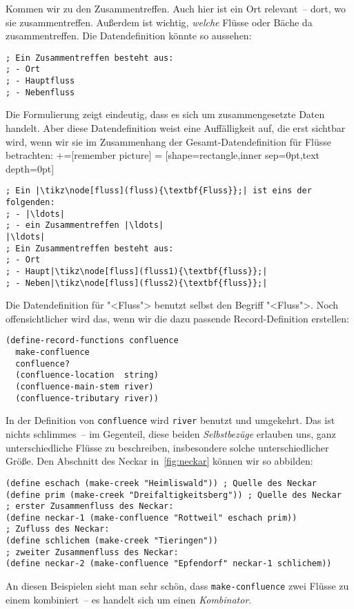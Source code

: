 Kommen wir zu den Zusammentreffen.  Auch hier ist ein Ort relevant~--
dort, wo sie zusammentreffen.  Außerdem ist wichtig, \emph{welche}
Flüsse oder Bäche da zusammentreffen.  Die Datendefinition könnte so
aussehen:
%
\begin{lstlisting}
; Ein Zusammentreffen besteht aus:
; - Ort
; - Hauptfluss
; - Nebenfluss
\end{lstlisting}
%
Die Formulierung zeigt eindeutig, dass es sich um zusammengesetzte
Daten handelt.  Aber diese Datendefinition weist eine Auffälligkeit
auf, die erst sichtbar wird, wenn wir sie im Zusammenhang der
Gesamt-Datendefinition für Flüsse betrachten:
%
+=[remember picture]
 = [shape=rectangle,inner sep=0pt,text depth=0pt]
%
\begin{lstlisting}
; Ein |\tikz\node[fluss](fluss){\textbf{Fluss}};| ist eins der folgenden:
; - |\ldots|
; - ein Zusammentreffen |\ldots|
|\ldots|
; Ein Zusammentreffen besteht aus:
; - Ort
; - Haupt|\tikz\node[fluss](fluss1){\textbf{fluss}};|
; - Neben|\tikz\node[fluss](fluss2){\textbf{fluss}};|
\end{lstlisting}
%
%
Die Datendefinition für "<Fluss"> benutzt selbst den Begriff
"<Fluss">.   Noch offensichtlicher wird das, wenn wir die dazu
passende Record-Definition erstellen:
%
\begin{lstlisting}
(define-record-functions confluence
  make-confluence
  confluence?
  (confluence-location  string)
  (confluence-main-stem river)
  (confluence-tributary river))
\end{lstlisting}
%
In der Definition von \texttt{confluence} wird \texttt{river} benutzt
und umgekehrt.  Das ist nichts schlimmes~-- im Gegenteil, diese beiden
\textit{Selbstbezüge} erlauben uns, ganz
unterschiedliche Flüsse zu beschreiben, insbesondere solche
unterschiedlicher Größe.  Den Abschnitt des Neckar in~\ref{fig:neckar}
können wir so abbilden:
%
\begin{lstlisting}
(define eschach (make-creek "Heimliswald")) ; Quelle des Neckar
(define prim (make-creek "Dreifaltigkeitsberg")) ; Quelle des Neckar
; erster Zusammenfluss des Neckar:
(define neckar-1 (make-confluence "Rottweil" eschach prim))
; Zufluss des Neckar:
(define schlichem (make-creek "Tieringen")) 
; zweiter Zusammenfluss des Neckar:
(define neckar-2 (make-confluence "Epfendorf" neckar-1 schlichem))
\end{lstlisting}
%
An diesen Beispielen sieht man sehr schön, dass
\texttt{make-confluence} zwei Flüsse zu einem kombiniert~-- es handelt
sich um einen \textit{Kombinator}.

